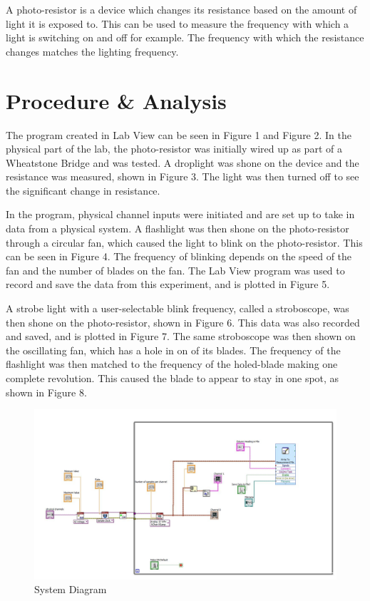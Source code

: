 \documentclass[12pt]{article}
\begin{document}
A photo-resistor is a device which changes its resistance based on the amount of light it is exposed to. This can be used to measure the frequency with which a light is switching on and off for example. The frequency with which the resistance changes matches the lighting frequency.


\section*{\fontsize{12}{12}\selectfont \large Procedure \& Analysis}

The program created in Lab View can be seen in Figure 1 and Figure 2. In the physical part of the lab, the photo-resistor was initially wired up as part of a Wheatstone Bridge and was tested. A droplight was shone on the device and the resistance was measured, shown in Figure 3. The light was then turned off to see the significant change in resistance.
\bigskip

In the program, physical channel inputs were initiated and are set up to take in data from a physical system. A flashlight was then shone on the photo-resistor through a circular fan, which caused the light to blink on the photo-resistor. This can be seen in Figure 4. The frequency of blinking depends on the speed of the fan and the number of blades on the fan. The Lab View program was used to record and save the data from this experiment, and is plotted in Figure 5. 
\bigskip

A strobe light with a user-selectable blink frequency, called a stroboscope, was then shone on the photo-resistor, shown in Figure 6. This data was also recorded and saved, and is plotted in Figure 7. The same stroboscope was then shown on the oscillating fan, which has a hole in on of its blades. The frequency of the flashlight was then matched to the frequency of the holed-blade making one complete revolution. This caused the blade to appear to stay in one spot, as shown in Figure 8.
\bigskip
 
 \newpage
 
 \begin{figure}[h!] %
   \centering
   \includegraphics[width=5in]{Lab5BackPanel.JPG} 
   \caption{System Diagram}
   \label{fig:example}
\end{figure}
\end{document}
